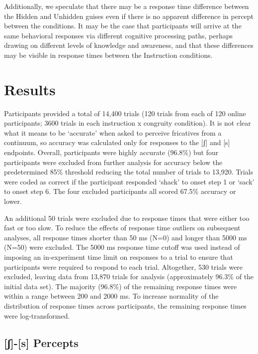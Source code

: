 \documentclass[
  letterpaper,
  DIV=11,
  numbers=noendperiod]{scrartcl}
\begin{document}
Additionally, we speculate that there may be a response time difference
between the Hidden and Unhidden guises even if there is no apparent
difference in percept between the conditions. It may be the case that
participants will arrive at the same behavioral responses via different
cognitive processing paths, perhaps drawing on different levels of
knowledge and awareness, and that these differences may be visible in
response times between the Instruction conditions.

\section{Results}\label{sec-results}

Participants provided a total of 14,400 trials (120 trials from each of
120 online participants; 3600 trials in each instruction x congruity
condition). It is not clear what it means to be `accurate' when asked to
perceive fricatives from a continuum, so accuracy was calculated only
for responses to the {[}ʃ{]} and {[}s{]} endpoints. Overall,
participants were highly accurate (96.8\%) but four participants were
excluded from further analysis for accuracy below the predetermined 85\%
threshold reducing the total number of trials to 13,920. Trials were
coded as correct if the participant responded `shack' to onset step 1 or
`sack' to onset step 6. The four excluded participants all scored 67.5\%
accuracy or lower.

An additional 50 trials were excluded due to response times that were
either too fast or too slow. To reduce the effects of response time
outliers on subsequent analyses, all response times shorter than 50 ms
(N=0) and longer than 5000 ms (N=50) were excluded. The 5000 ms response
time cutoff was used instead of imposing an in-experiment time limit on
responses to a trial to ensure that participants were required to
respond to each trial. Altogether, 530 trials were excluded, leaving
data from 13,870 trials for analysis (approximately 96.3\% of the
initial data set). The majority (96.8\%) of the remaining response times
were within a range between 200 and 2000 ms. To increase normality of
the distribution of response times across participants, the remaining
response times were log-transformed.

\subsection{{[}ʃ{]}-{[}s{]} Percepts}\label{sec-results-fricative}
\end{document}
